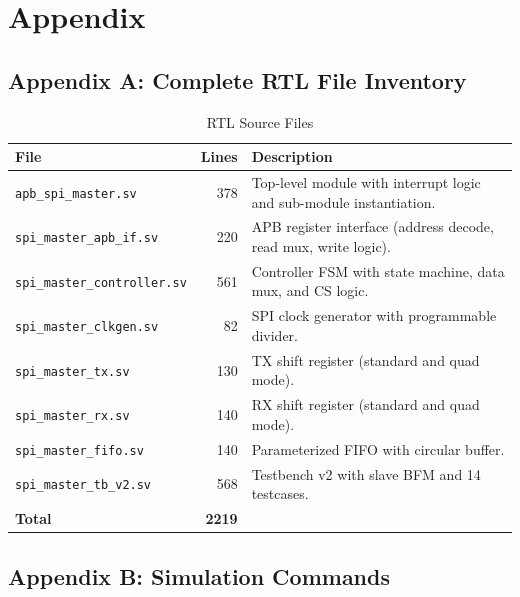 \chapter{Appendix}
\label{ch:appendix}

\section{Appendix A: Complete RTL File Inventory}

\begin{table}[H]
\centering
\caption{RTL Source Files}
\label{tab:rtl_files}
\begin{tabularx}{\textwidth}{@{}lrX@{}}
\toprule
\textbf{File} & \textbf{Lines} & \textbf{Description} \\
\midrule
\texttt{apb\_spi\_master.sv}       & 378  & Top-level module with interrupt logic and sub-module instantiation. \\
\texttt{spi\_master\_apb\_if.sv}   & 220  & APB register interface (address decode, read mux, write logic). \\
\texttt{spi\_master\_controller.sv}& 561  & Controller FSM with state machine, data mux, and CS logic. \\
\texttt{spi\_master\_clkgen.sv}    & 82   & SPI clock generator with programmable divider. \\
\texttt{spi\_master\_tx.sv}        & 130  & TX shift register (standard and quad mode). \\
\texttt{spi\_master\_rx.sv}        & 140  & RX shift register (standard and quad mode). \\
\texttt{spi\_master\_fifo.sv}      & 140  & Parameterized FIFO with circular buffer. \\
\texttt{spi\_master\_tb\_v2.sv}    & 568  & Testbench v2 with slave BFM and 14 testcases. \\
\midrule
\textbf{Total}                     & \textbf{2219} & \\
\bottomrule
\end{tabularx}
\end{table}

\section{Appendix B: Simulation Commands}

